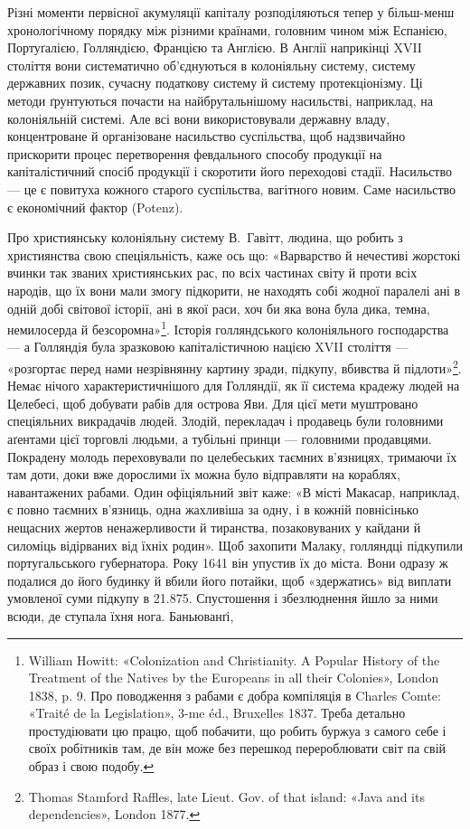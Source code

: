 
Різні моменти первісної акумуляції капіталу розподіляються
тепер у більш-менш хронологічному порядку між різними країнами,
головним чином між Еспанією, Портуґалією, Голляндією,
Францією та Англією. В Англії наприкінці XVII століття вони
систематично об’єднуються в колоніяльну систему, систему державних
позик, сучасну податкову систему й систему протекціонізму.
Ці методи ґрунтуються почасти на найбрутальнішому
насильстві, наприклад, на колоніяльній системі. Але всі вони
використовували державну владу, концентроване й організоване
насильство суспільства, щоб надзвичайно прискорити процес
перетворення февдального способу продукції на капіталістичний
спосіб продукції і скоротити його переходові стадії. Насильство —
це є повитуха кожного старого суспільства, вагітного новим.
Саме насильство є економічний фактор (Potenz).

Про християнську колоніяльну систему В.~Гавітт, людина,
що робить з християнства свою спеціяльність, каже ось що:
«Варварство й нечестиві жорстокі вчинки так званих християнських
рас, по всіх частинах світу й проти всіх народів, що їх
вони мали змогу підкорити, не находять собі жодної паралелі
ані в одній добі світової історії, ані в якої раси, хоч би яка вона
була дика, темна, немилосерда й безсоромна»\footnote{
William Howitt: «Colonization and Christianity. A Popular History
of the Treatment of the Natives by the Europeans in all their Colonies»,
London 1838, p. 9. Про поводження з рабами є добра компіляція в Charles
Comte: «Traité de la Legislation», 3-me éd., Bruxelles 1837. Треба детально
простудіювати цю працю, щоб побачити, що робить буржуа з
самого себе і своїх робітників там, де він може без перешкод перероблювати
світ па свій образ і свою подобу.
}. Історія голляндського
колоніяльного господарства — а Голляндія була
зразковою капіталістичною нацією XVII століття — «розгортає
перед нами незрівнянну картину зради, підкупу, вбивства
й підлоти»\footnote{
Thomas Stamford Raffles, late Lieut. Gov. of that island: «Java
and its dependencies», London 1877.
}. Немає нічого характеристичнішого для Голляндії,
як її система крадежу людей на Целебесі, щоб добувати рабів
для острова Яви. Для цієї мети муштровано спеціяльних викрадачів
людей. Злодій, перекладач і продавець були головними аґентами
цієї торговлі людьми, а тубільні принци — головними продавцями.
Покрадену молодь переховували по целебеських таємних в’язницях,
тримаючи їх там доти, доки вже дорослими їх можна було
відправляти на кораблях, навантажених рабами. Один офіціяльний
звіт каже: «В місті Макасар, наприклад, є повно таємних в’язниць,
одна жахливіша за одну, і в кожній повнісінько нещасних
жертов ненажерливости й тиранства, позаковуваних у кайдани
й силоміць відірваних від їхніх родин». Щоб захопити Малаку,
голляндці підкупили португальського губернатора. Року 1641
він упустив їх до міста. Вони одразу ж подалися до його будинку
й вбили його потайки, щоб «здержатись» від виплати умовленої
суми підкупу в \num{21.875}. Спустошення і збезлюднення
йшло за ними всюди, де ступала їхня нога. Баньюванґі,
\parbreak{}  %
